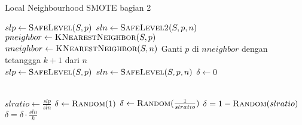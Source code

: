 \begin{algorithm}[htbp]
	\caption{Local Neighbourhood SMOTE bagian 2}
	\begin{algorithmic}[1]

	\State $ slp \gets \Call{SafeLevel}{S, p} $
	\State $ sln \gets \Call{SafeLevel2}{S, p, n} $
	\State {}
\EndFunction
\\
	\State $ pneighbor \gets \Call{KNearestNeighbor}{S, p} $
	\State {}
\EndFunction
\\
	\State $ nneighbor \gets \Call{KNearestNeighbor}{ S, n } $
		\State Ganti $ p $ di $ nneighbor $ dengan tetanggga $ k + 1 $
		dari $ n $
	\EndIf
	\State {}
\EndFunction
\\
	\State $ slp \gets \Call{SafeLevel}{S, p} $
	\State $ sln \gets \Call{SafeLevel}{S, p, n} $
	\State $ \delta \gets 0 $

		\State \Return{$ \delta $}
	\EndIf
	\\
	\State $ slratio \gets \frac{slp}{sln} $
		\State $ \delta \gets \Call{Random}{1} $
		\State $ \delta \gets \Call{Random}{\frac{1}{slratio}} $
	\Else
		\State $ \delta = 1 - \Call{Random}{slratio} $
	\EndIf
	\\
		\State $ \delta = \delta \cdot \frac{sln}{k} $
	\EndIf
	\\
	\State \Return{$ \delta $}
\EndFunction
	\end{algorithmic}
\end{algorithm}

